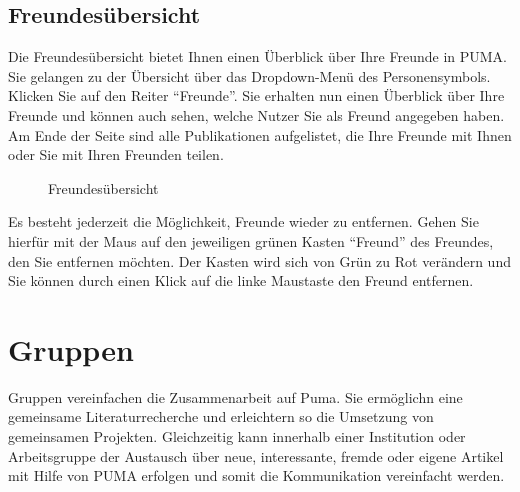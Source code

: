 \subsection{Freundesübersicht}
\label{subsec:freundesuebersicht}
Die Freundesübersicht bietet Ihnen einen Überblick über Ihre Freunde in PUMA. Sie gelangen zu der Übersicht über das Dropdown-Menü des Personensymbols. Klicken Sie auf den Reiter \enquote{Freunde}. Sie erhalten nun einen Überblick über Ihre Freunde und können auch sehen, welche Nutzer Sie als Freund angegeben haben. Am Ende der Seite sind alle Publikationen aufgelistet, die Ihre Freunde mit Ihnen oder Sie mit Ihren Freunden teilen.\newline
\begin{figure}[h!]
 \centering
 \caption{Freundesübersicht}
 \label{fig:freundesuebersicht}
\end{figure}
Es besteht jederzeit die Möglichkeit, Freunde wieder zu entfernen. Gehen Sie hierfür mit der Maus auf den jeweiligen grünen Kasten \enquote{Freund} des Freundes, den Sie entfernen möchten. Der Kasten wird sich von Grün zu Rot verändern und Sie können durch einen Klick auf die linke Maustaste den Freund entfernen. 
\section{Gruppen}
\label{sec:gruppen}
Gruppen vereinfachen die Zusammenarbeit auf Puma. Sie ermöglichn eine gemeinsame Literaturrecherche und erleichtern so die Umsetzung von gemeinsamen Projekten. Gleichzeitig kann innerhalb einer Institution oder Arbeitsgruppe der Austausch über neue, interessante, fremde oder eigene Artikel mit Hilfe von PUMA erfolgen und somit die Kommunikation vereinfacht werden. 
